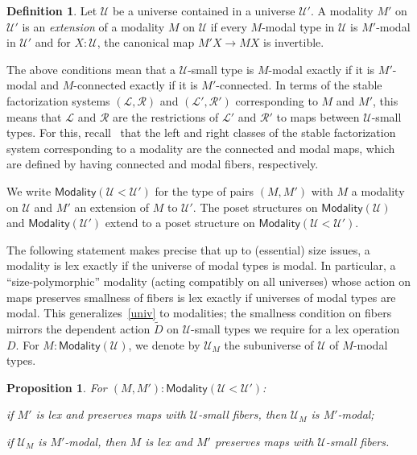\documentclass[10pt,a4paper,draft]{article}
\newcommand{\UU}{\mathcal{U}}%
\newcommand{\D}{D}              %
\newcommand{\DD}{\tilde{D}} %
\renewcommand{\~}{\widetilde}
\newcommand{\Modality}{\mathsf{Modality}}
\newtheorem{proposition}[theorem]{Proposition}
\theoremstyle{definition}
\newtheorem{definition}[theorem]{Definition}
\theoremstyle{remark} %
\begin{document}
\begin{definition} \label{modality-extension}
Let $\UU$ be a universe contained in a universe $\UU'$.
A modality $M'$ on $\UU'$ is an \emph{extension} of a modality $M$ on $\UU$ if every $M$\hyp{}modal type in $\UU$ is $M'$\hyp{}modal in $\UU'$ and for $X : \UU$, the canonical map $M'X \to MX$ is invertible.
\end{definition}

The above conditions mean that a $\UU$\hyp{}small type is $M$\hyp{}modal exactly if it is $M'$\hyp{}modal and $M$\hyp{}connected exactly if it is $M'$\hyp{}connected.
In terms of the stable factorization systems $(\mathcal{L}, \mathcal{R})$ and $(\mathcal{L}', \mathcal{R}')$ corresponding to $M$ and $M'$, this means that $\mathcal{L}$ and $\mathcal{R}$ are the restrictions of $\mathcal{L}'$ and $\mathcal{R}'$ to maps between $\UU$\hyp{}small types.
For this, recall~\cite[Subsection~1.2]{RijkeSS17} that the left and right classes of the stable factorization system corresponding to a modality are the connected and modal maps, which are defined by having connected and modal fibers, respectively.

We write $\Modality(\UU < \UU')$ for the type of pairs $(M, M')$ with $M$ a modality on $\UU$ and $M'$ an extension of $M$ to $\UU'$.
The poset structures on $\Modality(\UU)$ and $\Modality(\UU')$ extend to a poset structure on $\Modality(\UU < \UU')$.

The following statement makes precise that up to (essential) size issues, a modality is lex exactly if the universe of modal types is modal.
In particular, a ``size\hyp{}polymorphic'' modality (acting compatibly on all universes) whose action on maps preserves smallness of fibers is lex exactly if universes of modal types are modal.
This generalizes~\cref{univ} to modalities; the smallness condition on fibers mirrors the dependent action $\DD$ on $\UU$\hyp{}small types we require for a lex operation $\D$.
For $M : \Modality(\UU)$, we denote by $\UU_M$ the subuniverse of $\UU$ of $M$\hyp{}modal types.
\begin{proposition} \label{modality-lex-via-universe}
For $(M, M') : \Modality(\UU < \UU')$:
\begin{parts}
\item \label{modality-lex-via-universe:lex-to-universe}
if $M'$ is lex and preserves maps with $\UU$\hyp{}small fibers, then $\UU_M$ is $M'$\hyp{}modal;
\item \label{modality-lex-via-universe:universe-to-lex}
if $\UU_M$ is $M'$\hyp{}modal, then $M$ is lex and $M'$ preserves maps with $\UU$\hyp{}small fibers.
\end{parts}
\end{proposition}
\end{document}
